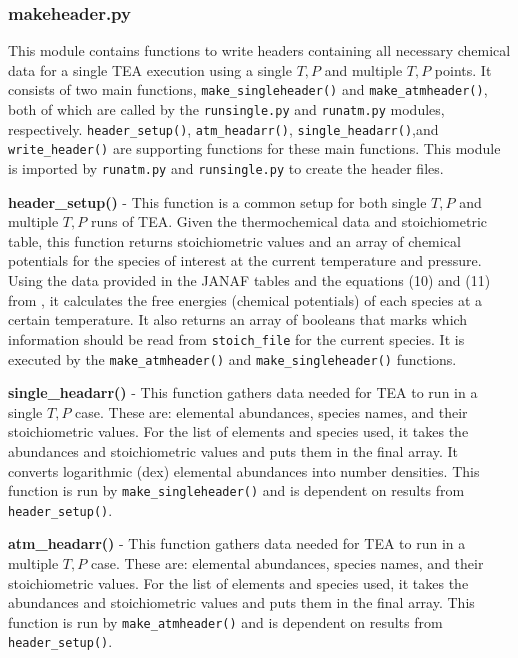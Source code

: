 \subsubsection{makeheader.py}
\label{makeheaderSec}

This module contains functions to write headers containing all
necessary chemical data for a single TEA execution using a single $T,
P$ and multiple $T, P$ points. It consists of two main
functions, \newline \texttt{make\_singleheader()}
and \texttt{make\_atmheader()}, both of which are called by the
\newline \texttt{runsingle.py} and \texttt{runatm.py} modules,
respectively. \texttt{header\_setup()}, \newline \texttt{atm\_headarr()}, \texttt{single\_headarr()},and \texttt{write\_header()}
are supporting functions for these main functions. This module is
imported by \texttt{runatm.py} and \texttt{runsingle.py} to create the
header files.

{\bf header\_setup()} - This function is a common setup for both
single $T, P$ and multiple $T, P$ runs of TEA. Given the
thermochemical data and stoichiometric table, this function returns
stoichiometric values and an array of chemical potentials for the
species of interest at the current temperature and pressure.  Using
the data provided in the JANAF tables and the equations (10) and (11)
from \citet{BlecicEtal2015-TEAtheory}, it calculates the free energies
(chemical potentials) of each species at a certain temperature. It
also returns an array of booleans that marks which information should
be read from \texttt{stoich\_file} for the current species. It is
executed by the \texttt{make\_atmheader()}
and \texttt{make\_singleheader()} functions.

{\bf single\_headarr()} - This function gathers data needed for TEA to
run in a single $T, P$ case. These are: elemental abundances, species
names, and their stoichiometric values. For the list of elements and
species used, it takes the abundances and stoichiometric values and
puts them in the final array. It converts logarithmic (dex) elemental
abundances into number densities. This function is run
by \texttt{make\_singleheader()} and is dependent on results
from \texttt{header\_setup()}.

{\bf atm\_headarr()} - This function gathers data needed for TEA to
run in a multiple $T, P$ case. These are: elemental abundances,
species names, and their stoichiometric values. For the list of
elements and species used, it takes the abundances and stoichiometric
values and puts them in the final array. This function is run
by \texttt{make\_atmheader()} and is dependent on results
from \texttt{header\_setup()}.

